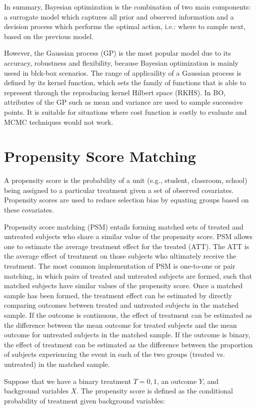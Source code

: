 \documentclass{article}
\begin{document}
In summary, Bayesian optimization is the combination of two main components: a surrogate model which captures all prior and observed information and a decision process which performs the optimal action, i.e.: where to sample next, based on the previous model.

However, the Gaussian process (GP) is the most popular model due to
its accuracy, robustness and flexibility, because Bayesian
optimization is mainly usesd in blck-box scenarios. The range of
applicaility of a Gaussian process is defined by its kernel function,
which sets the family of functions that is able to represent through
the reproducing kernel Hilbert space (RKHS). In BO, attributes of the
GP such as mean and variance are used to sample successive points. It
is suitable for situations where cost function is costly to evaluate
and MCMC techniques would not work.

\section{Propensity Score Matching}
A propensity score is the probability of a unit (e.g., student,
classroom, school) being assigned to a particular treatment given a
set of observed covariates. Propensity scores are used to reduce
selection bias by equating groups based on these covariates.

Propensity score matching (PSM) entails forming matched sets of treated and
untreated subjects who share a similar value of the propensity
score. PSM allows one to estimate the average treatment effect for the
treated (ATT). The ATT is the average effect of treatment on those
subjects who ultimately receive the treatment. The most common
implementation of PSM is one-to-one or pair matching, in which pairs
of treated and untreated subjects are formed, such that matched
subjects have similar values of the propensity score. Once a matched
sample has been formed, the treatment effect can be estimated by
directly comparing outcomes between treated and untreated subjects in
the matched sample. If the outcome is continuous, the effect of
treatment can be estimated as the difference between the mean outcome
for treated subjects and the mean outcome for untreated subjects in
the matched sample. If the outcome is binary, the effect of treatment
can be estimated as the difference between the proportion of subjects
experiencing the event in each of the two groups (treated
vs. untreated) in the matched sample.

Suppose that we have a binary treatment $T={0,1}$, an outcome $Y$, and
background variables $X$. The propensity score is defined as the
conditional probability of treatment given background variables:
\end{document}
